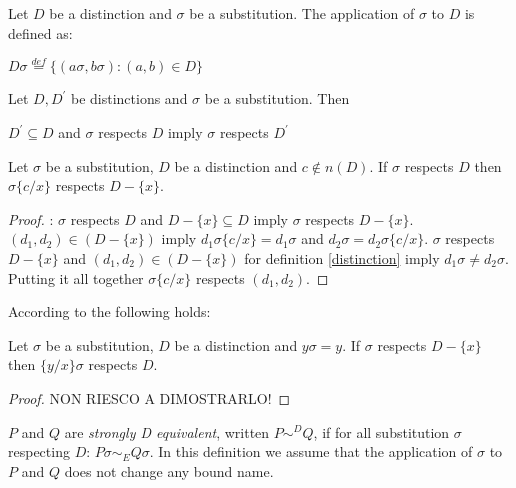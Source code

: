 \begin{definition}
  Let $D$ be a distinction and $\sigma$ be a substitution. The application of $\sigma$ to $D$ is defined as:
  \begin{center}
    $D\sigma \stackrel{def}{=} \{(a\sigma,b\sigma): (a,b)\in D\}$
  \end{center}
\end{definition}

\begin{proposition}
  Let $D,D^{'}$ be distinctions and $\sigma$ be a substitution. Then
  \begin{center}
    $D^{'}\subseteq D$ and $\sigma$ respects $D$ imply $\sigma$ respects $D^{'}$
  \end{center}
\end{proposition}


\begin{lemma}\label{distinctionSubstitution}
  Let $\sigma$ be a substitution, $D$ be a distinction and $c\notin n(D)$. If $\sigma$ respects $D$ then $\sigma\{c/x\}$ respects $D-\{x\}$.
  \begin{proof}:
    $\sigma$ respects $D$ and $D-\{x\}\subseteq D$ imply $\sigma$ respects $D-\{x\}$. $(d_{1},d_{2}) \in (D-\{x\})$ imply $d_{1} \sigma\{c/x\} = d_{1} \sigma$ and $d_{2} \sigma = d_{2} \sigma\{c/x\}$. $\sigma$ respects $D-\{x\}$ and $(d_{1},d_{2}) \in (D-\{x\})$ for definition \ref{distinction} imply $d_{1} \sigma \neq d_{2} \sigma$.  Putting it all together $\sigma \{c/x\}$ respects $(d_{1}, d_{2})$.
  \end{proof}
\end{lemma}

According to \cite{milnerparrowwalker} the following holds:
\begin{lemma}\label{distinctionSubstitution2}
  Let $\sigma$ be a substitution, $D$ be a distinction and $y \sigma = y$. If $\sigma$ respects $D-\{x\}$ then $\{y/x\}\sigma$ respects $D$.
  \begin{proof}
    NON RIESCO A DIMOSTRARLO!
  \end{proof}
\end{lemma}



\begin{definition}\label{strongDequivalence}
  $P$ and $Q$ are \emph{strongly D equivalent}, written $P \sim^{D} Q$, if for all substitution $\sigma$ respecting $D$: $P\sigma \sim_{E} Q\sigma$. In this definition we assume that the application of $\sigma$ to $P$ and $Q$ does not change any bound name.
\end{definition}

